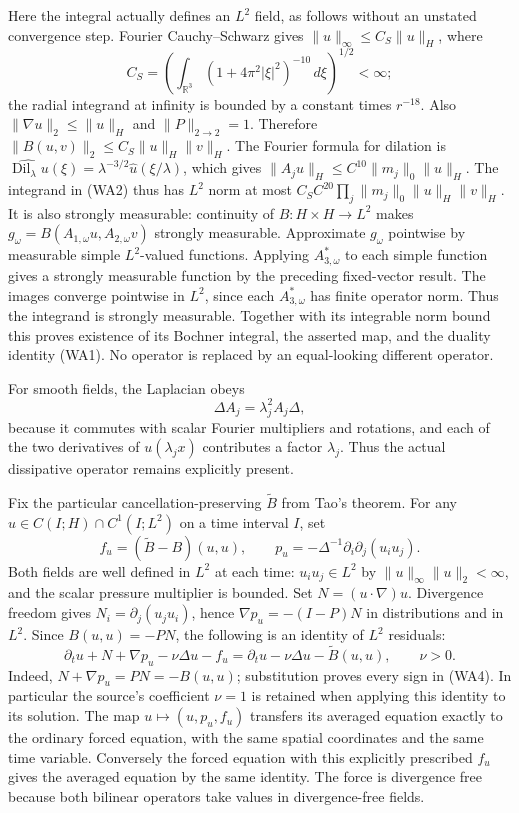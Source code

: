 Here the integral actually defines an $L^2$ field, as follows without an
unstated convergence step. Fourier Cauchy--Schwarz gives
$\|u\|_\infty\leq C_S\|u\|_H$, where
\[
 C_S=\left(\int_{\mathbb R^3}(1+4\pi^2|\xi|^2)^{-10}\,d\xi\right)^{1/2}<\infty;
\]
the radial integrand at infinity is bounded by a constant times $r^{-18}$.
Also $\|\nabla u\|_2\leq\|u\|_H$ and $\|P\|_{2\to2}=1$.
Therefore $\|B(u,v)\|_2\leq C_S\|u\|_H\|v\|_H$.
The Fourier formula for dilation is
$\widehat{\operatorname{Dil}_\lambda u}(\xi)=\lambda^{-3/2}\widehat u(\xi/\lambda)$,
which gives $\|A_j u\|_H\leq C^{10}\|m_j\|_0\|u\|_H$.
The integrand in (WA2) thus has $L^2$ norm at most
$C_SC^{20}\prod_j\|m_j\|_0\|u\|_H\|v\|_H$.
It is also strongly measurable: continuity of $B:H\times H\to L^2$
makes $g_\omega=B(A_{1,\omega}u,A_{2,\omega}v)$ strongly measurable.
Approximate $g_\omega$ pointwise by measurable simple $L^2$-valued
functions. Applying $A_{3,\omega}^*$ to each simple function gives a
strongly measurable function by the preceding fixed-vector result.
The images converge pointwise in $L^2$, since each $A_{3,\omega}^*$
has finite operator norm. Thus the integrand is strongly measurable.
Together with its integrable norm bound this proves existence of its
Bochner integral, the asserted map, and the duality identity (WA1).
No operator is replaced by an equal-looking different operator.

For smooth fields, the Laplacian obeys
\[
 \Delta A_j=\lambda_j^2 A_j\Delta,                       \tag{WA3}
\]
because it commutes with scalar Fourier multipliers and rotations, and each
of the two derivatives of $u(\lambda_jx)$ contributes a factor $\lambda_j$.
Thus the actual dissipative operator remains explicitly present.

Fix the particular cancellation-preserving $\widetilde B$ from Tao's theorem.
For any $u\in C(I;H)\cap C^1(I;L^2)$ on a time interval $I$, set
\[
 f_u=(\widetilde B-B)(u,u),\qquad
 p_u=-\Delta^{-1}\partial_i\partial_j(u_i u_j).
\]
Both fields are well defined in $L^2$ at each time: $u_i u_j\in L^2$ by
$\|u\|_\infty\|u\|_2<\infty$, and the scalar pressure multiplier is bounded.
Set $N=(u\cdot\nabla)u$. Divergence freedom gives
$N_i=\partial_j(u_j u_i)$, hence
$\nabla p_u=-(I-P)N$ in distributions and in $L^2$.
Since $B(u,u)=-PN$, the following is an identity of $L^2$ residuals:
\[
 \partial_tu+N+\nabla p_u-\nu\Delta u-f_u
 =\partial_tu-\nu\Delta u-\widetilde B(u,u),\qquad \nu>0. \tag{WA4}
\]
Indeed, $N+\nabla p_u=PN=-B(u,u)$; substitution proves every sign in
(WA4). In particular the source's coefficient $\nu=1$ is retained when
applying this identity to its solution. The map $u\mapsto(u,p_u,f_u)$
transfers its averaged equation exactly to the ordinary forced equation,
with the same spatial coordinates and the same time variable. Conversely
the forced equation with this explicitly prescribed $f_u$ gives the averaged
equation by the same identity. The force is divergence free because both
bilinear operators take values in divergence-free fields.


